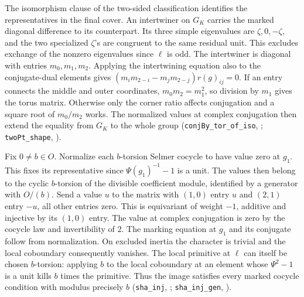 The isomorphism clause of the two-sided classification identifies the
representatives in the final cover. An intertwiner on $G_K$ carries
the marked diagonal difference to its counterpart. Its three simple
eigenvalues are $\zeta,0,-\zeta$, and the two specialized $\zeta$'s
are congruent to the same residual unit. This excludes exchange of
the nonzero eigenvalues since $\ell$ is odd. The intertwiner is
diagonal with entries $m_0,m_1,m_2$. Applying the intertwining equation
also to the conjugate-dual elements gives
$(m_i m_{2-i}-m_j m_{2-j})r(g)_{ij}=0$. If an entry connects the
middle and outer coordinates, $m_0m_2=m_1^2$, so division by $m_1$
gives the torus matrix. Otherwise only the corner ratio affects
conjugation and a square root of $m_0/m_2$ works. The normalized
values at complex conjugation then extend the equality from $G_K$
to the whole group (\nolinkurl{conjBy_tor_of_iso},
;
\nolinkurl{twoPt_shape}, ).

Fix $0\ne b\in O$. Normalize each $b$-torsion Selmer cocycle
to have value zero at $g_1$. This fixes its representative since
$\Psi(g_1)^{-1}-1$ is a unit. The values then belong to the cyclic
$b$-torsion of the divisible coefficient module, identified by a
generator with $O/(b)$. Send a value $u$ to the matrix with
$(1,0)$ entry $u$ and $(2,1)$ entry $-u$, all other entries zero.
This is equivariant of weight $-1$, additive and injective by its
$(1,0)$ entry. The value at complex conjugation is zero by the
cocycle law and invertibility of $2$. The marking equation at
$g_1$ and its conjugate follow from normalization. On excluded inertia
the character is trivial and the local coboundary consequently
vanishes. The local primitive at $\ell$ can itself be chosen
$b$-torsion: applying $b$ to the local coboundary at an element
whose $\Psi^2-1$ is a unit kills $b$ times the primitive.
Thus the image satisfies every marked cocycle condition with
modulus precisely $b$
(\nolinkurl{sha_inj}, ;
\nolinkurl{sha_inj_gen}, ).

